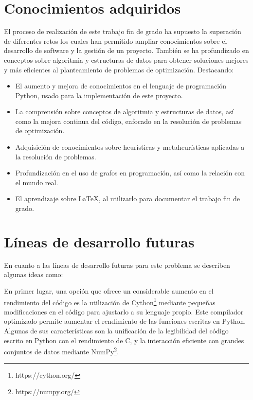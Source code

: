 
\section{Conocimientos adquiridos}

El proceso de realización de este trabajo fin de grado ha supuesto la superación de diferentes retos los cuales han permitido ampliar conocimientos sobre el desarrollo de software y la gestión de un proyecto. También se ha profundizado en conceptos sobre algoritmia y estructuras de datos para obtener soluciones mejores y más eficientes al planteamiento de problemas de optimización. Destacando:

\begin{itemize}
  \item El aumento y mejora de conocimientos en el lenguaje de programación Python, usado para la implementación de este proyecto.
  \item La comprensión sobre conceptos de algoritmia y estructuras de datos, así como la mejora continua del código, enfocado en la resolución de problemas de optimización.
  \item Adquisición de conocimientos sobre heurísticas y metaheurísticas aplicadas a la resolución de problemas.
  \item Profundización en el uso de grafos en programación, así como la relación con el mundo real.
  \item El aprendizaje sobre \LaTeX, al utilizarlo para documentar el trabajo fin de grado.
\end{itemize}

\section{Líneas de desarrollo futuras}
En cuanto a las líneas de desarrollo futuras para este problema se describen algunas ideas como:

En primer lugar, una opción que ofrece un considerable aumento en el rendimiento del código es la utilización de Cython\footnote{https://cython.org/} mediante pequeñas modificaciones en el código para ajustarlo a su lenguaje propio. Este compilador optimizado permite aumentar el  rendimiento de las funciones escritas en Python. Algunas de sus características son la unificación de la legibilidad del código escrito en Python con el rendimiento de C, y la interacción eficiente con grandes conjuntos de datos mediante NumPy\footnote{https://numpy.org/}.

